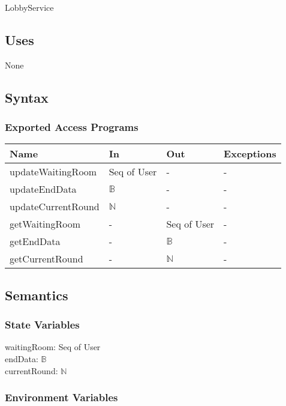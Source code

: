 \documentclass[12pt, titlepage]{article}
\begin{document}
LobbyService

\subsection{Uses}
None

\subsection{Syntax}

\subsubsection{Exported Access Programs}

\begin{center}
\begin{tabular}{| p{5cm} | p{4cm} | p{2.2cm} | p{2.25cm} |}
\hline
\textbf{Name} & \textbf{In} & \textbf{Out} & \textbf{Exceptions} \\
\hline
updateWaitingRoom & Seq of User & - & - \\
\hline
updateEndData & $\mathbb{B}$ & - & - \\
\hline
updateCurrentRound & $\mathbb{N}$& - & - \\
\hline
getWaitingRoom & - & Seq of User & - \\
\hline
getEndData & - & $\mathbb{B}$ & - \\
\hline
getCurrentRound & - & $\mathbb{N}$ & - \\



\hline
\end{tabular}
\end{center}

\subsection{Semantics}

\subsubsection{State Variables}

waitingRoom: Seq of User \\
endData: $\mathbb{B}$ \\
currentRound: $\mathbb{N}$

\subsubsection{Environment Variables}
\end{document}
